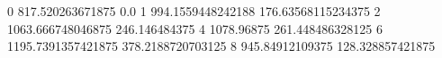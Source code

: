 0 817.520263671875 0.0
1 994.1559448242188 176.63568115234375
2 1063.666748046875 246.146484375
4 1078.96875 261.448486328125
6 1195.7391357421875 378.2188720703125
8 945.84912109375 128.328857421875
